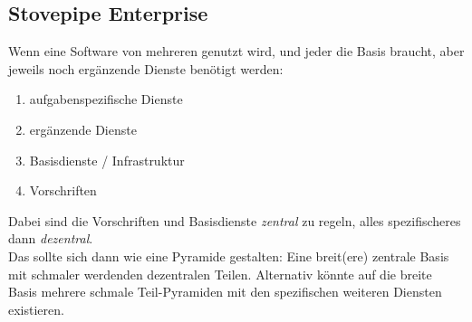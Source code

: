 \subsection{Stovepipe Enterprise}

Wenn eine Software von mehreren genutzt wird, und jeder die Basis braucht, aber jeweils noch ergänzende Dienste benötigt werden:
\begin{enumerate}
\item aufgabenspezifische Dienste
\item ergänzende Dienste
\item Basisdienste / Infrastruktur
\item Vorschriften
\end{enumerate}
Dabei sind die Vorschriften und Basisdienste \emph{zentral} zu regeln, alles spezifischeres dann \emph{dezentral}.\\
Das sollte sich dann wie eine Pyramide gestalten: Eine breit(ere) zentrale Basis mit schmaler werdenden dezentralen Teilen. Alternativ könnte auf die breite Basis mehrere schmale Teil-Pyramiden mit den spezifischen weiteren Diensten existieren.









